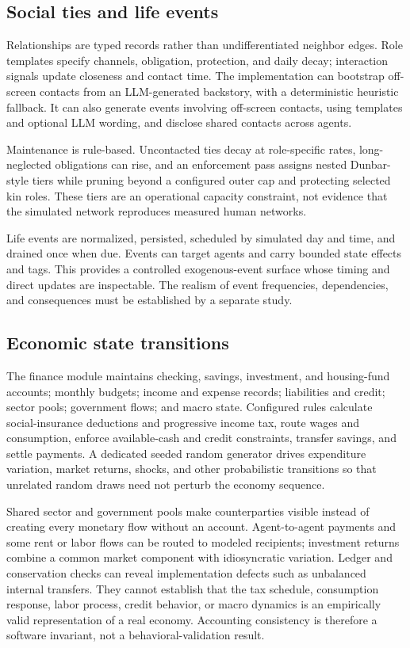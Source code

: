 \subsection{Social ties and life events}

Relationships are typed records rather than undifferentiated neighbor edges.
Role templates specify channels, obligation, protection, and daily decay;
interaction signals update closeness and contact time.  The implementation can
bootstrap off-screen contacts from an LLM-generated backstory, with a
deterministic heuristic fallback.  It can also generate events involving
off-screen contacts, using templates and optional LLM wording, and disclose
shared contacts across agents.

Maintenance is rule-based.  Uncontacted ties decay at role-specific rates,
long-neglected obligations can rise, and an enforcement pass assigns nested
Dunbar-style tiers while pruning beyond a configured outer cap and protecting
selected kin roles.  These tiers are an operational capacity constraint, not
evidence that the simulated network reproduces measured human networks.

Life events are normalized, persisted, scheduled by simulated day and time,
and drained once when due.  Events can target agents and carry bounded state
effects and tags.  This provides a controlled exogenous-event surface whose
timing and direct updates are inspectable.  The realism of event frequencies,
dependencies, and consequences must be established by a separate study.

\subsection{Economic state transitions}

The finance module maintains checking, savings, investment, and housing-fund
accounts; monthly budgets; income and expense records; liabilities and credit;
sector pools; government flows; and macro state.  Configured rules calculate
social-insurance deductions and progressive income tax, route wages and
consumption, enforce available-cash and credit constraints, transfer savings,
and settle payments.  A dedicated seeded random generator drives expenditure
variation, market returns, shocks, and other probabilistic transitions so that
unrelated random draws need not perturb the economy sequence.

Shared sector and government pools make counterparties visible instead of
creating every monetary flow without an account.  Agent-to-agent payments and
some rent or labor flows can be routed to modeled recipients; investment
returns combine a common market component with idiosyncratic variation.
Ledger and conservation checks can reveal implementation defects such as
unbalanced internal transfers.  They cannot establish that the tax schedule,
consumption response, labor process, credit behavior, or macro dynamics is an
empirically valid representation of a real economy.  Accounting consistency
is therefore a software invariant, not a behavioral-validation result.


